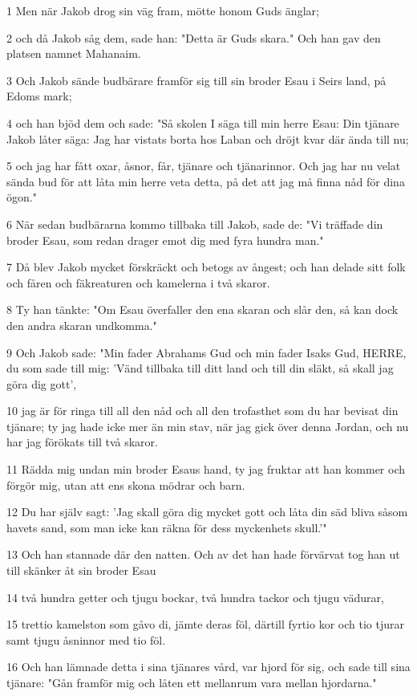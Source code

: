 \par 1 Men när Jakob drog sin väg fram, mötte honom Guds änglar;
\par 2 och då Jakob såg dem, sade han: "Detta är Guds skara." Och han gav den platsen namnet Mahanaim.
\par 3 Och Jakob sände budbärare framför sig till sin broder Esau i Seirs land, på Edoms mark;
\par 4 och han bjöd dem och sade: "Så skolen I säga till min herre Esau: Din tjänare Jakob låter säga: Jag har vistats borta hos Laban och dröjt kvar där ända till nu;
\par 5 och jag har fått oxar, åsnor, får, tjänare och tjänarinnor. Och jag har nu velat sända bud för att låta min herre veta detta, på det att jag må finna nåd för dina ögon."
\par 6 När sedan budbärarna kommo tillbaka till Jakob, sade de: "Vi träffade din broder Esau, som redan drager emot dig med fyra hundra man."
\par 7 Då blev Jakob mycket förskräckt och betogs av ångest; och han delade sitt folk och fåren och fäkreaturen och kamelerna i två skaror.
\par 8 Ty han tänkte: "Om Esau överfaller den ena skaran och slår den, så kan dock den andra skaran undkomma."
\par 9 Och Jakob sade: "Min fader Abrahams Gud och min fader Isaks Gud, HERRE, du som sade till mig: 'Vänd tillbaka till ditt land och till din släkt, så skall jag göra dig gott',
\par 10 jag är för ringa till all den nåd och all den trofasthet som du har bevisat din tjänare; ty jag hade icke mer än min stav, när jag gick över denna Jordan, och nu har jag förökats till två skaror.
\par 11 Rädda mig undan min broder Esaus hand, ty jag fruktar att han kommer och förgör mig, utan att ens skona mödrar och barn.
\par 12 Du har själv sagt: 'Jag skall göra dig mycket gott och låta din säd bliva såsom havets sand, som man icke kan räkna för dess myckenhets skull.'"
\par 13 Och han stannade där den natten. Och av det han hade förvärvat tog han ut till skänker åt sin broder Esau
\par 14 två hundra getter och tjugu bockar, två hundra tackor och tjugu vädurar,
\par 15 trettio kamelston som gåvo di, jämte deras föl, därtill fyrtio kor och tio tjurar samt tjugu åsninnor med tio föl.
\par 16 Och han lämnade detta i sina tjänares vård, var hjord för sig, och sade till sina tjänare: "Gån framför mig och låten ett mellanrum vara mellan hjordarna."
